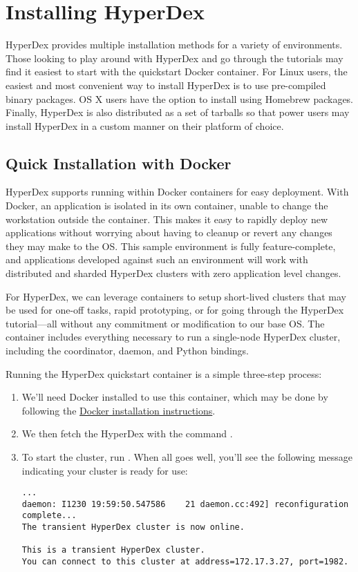 \chapter{Installing HyperDex}
\label{chap:installation}

HyperDex provides multiple installation methods for a variety of environments.
Those looking to play around with HyperDex and go through the tutorials may find
it easiest to start with the quickstart Docker container.  For Linux users, the
easiest and most convenient way to install HyperDex is to use pre-compiled
binary packages.  OS X users have the option to install using Homebrew
packages.  Finally, HyperDex is also distributed as a set of tarballs so that
power users may install HyperDex in a custom manner on their platform of choice.

\section{Quick Installation with Docker}

HyperDex supports running within Docker containers for easy deployment.  With
Docker, an application is isolated in its own container, unable to change the
workstation outside the container.  This makes it easy to rapidly deploy new
applications without worrying about having to cleanup or revert any changes they
may make to the OS.  This sample environment is fully feature-complete, and
applications developed against such an environment will work with distributed
and sharded HyperDex clusters with zero application level changes.

For HyperDex, we can leverage containers to setup short-lived clusters that may
be used for one-off tasks, rapid prototyping, or for going through the HyperDex
tutorial---all without any commitment or modification to our base OS.  The
 container includes everything necessary to run a
single-node HyperDex cluster, including the coordinator, daemon, and Python
bindings.

Running the HyperDex quickstart container is a simple three-step process:

\begin{enumerate}
\item We'll need Docker installed to use this container, which may be done by
following the \href{https://docs.docker.com/installation/}{Docker installation
instructions}.
\item We then fetch the HyperDex with the command .
\item To start the cluster, run .  When all goes well, you'll see the following message
indicating your cluster is ready for use:

\begin{verbatim}
...
daemon: I1230 19:59:50.547586    21 daemon.cc:492] reconfiguration complete...
The transient HyperDex cluster is now online.

This is a transient HyperDex cluster.
You can connect to this cluster at address=172.17.3.27, port=1982.
\end{verbatim}
\end{enumerate}


